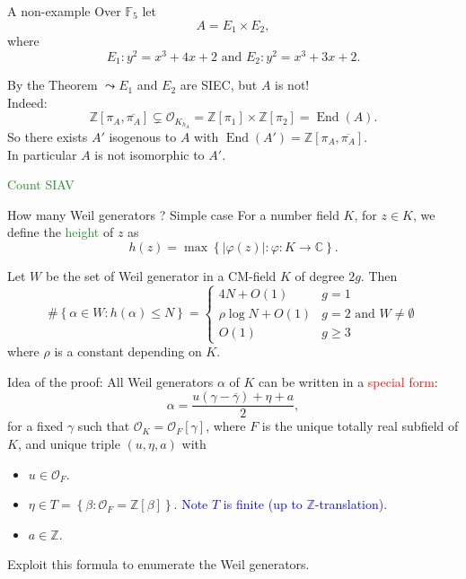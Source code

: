 \documentclass[usenames,dvipsnames,handout]{beamer}
\def\Z{\mathbb{Z}}
\def\C{\mathbb{C}}
\def\F{\mathbb{F}}
\DeclareMathOperator{\Pic}{Pic}
\DeclareMathOperator{\End}{End}
\newcommand{\cO}{{\mathcal O}}
\newcommand{\vphi}{\varphi}
\newcommand{\set}[1]{\left\lbrace#1\right\rbrace }
\newcommand{\red}[1]{\textcolor{red}{#1}}
\newcommand{\blue}[1]{\textcolor{blue}{#1}}
\newcommand{\green}[1]{\textcolor{ForestGreen}{#1}}
\begin{document}
\begin{frame}{ A non-example }
    Over $\F_5$ let
    \[ A = E_1 \times E_2, \]
    where
    \[ E_1: y^2 = x^3 + 4x + 2 \text{ and } E_2: y^2 = x^3 + 3x + 2. \]  
      
    \pause By the Theorem $\leadsto E_1$ and $E_2$ are SIEC, but $A$ is not!\\
    \pause Indeed:
    \[\Z[\pi_A,\overline{\pi_A}] \subsetneq \cO_{K_{h_A}}=\Z[\pi_1]\times \Z[\pi_2]=\End(A).\]
    So there exists $A'$ isogenous to $A$ with $\End(A')=\Z[\pi_A,\overline{\pi_A}]$.\\
    In particular $A$ is not isomorphic to $A'$.
\end{frame}

\begin{frame}{ }
    \begin{center}
    \green{\huge Count SIAV}
    \end{center}
\end{frame}

\begin{frame}{ How many Weil generators ? Simple case }
    For a number field $K$, for $z \in K$, we define the \green{height} of $z$ as 
    \[ h(z)= \max\set{|\vphi(z)| : \vphi: K\to \C }. \]
    \pause    
    \begin{theorem}[Scholl 2020]
    Let $W$ be the set of Weil generator in a CM-field $K$ of degree $2g$.
    \pause Then
    \[ 
    \#\set{ \alpha\in W : h(\alpha)\leq N }=
    \begin{cases}
        4N+O(1)             & g=1\\
        \rho \log N +O(1)   & g=2\text{ and }W\neq \emptyset\\
        O(1)                & g\geq 3
    \end{cases}    
     \]
    where $\rho$ is a constant depending on $K$.
    \end{theorem}
\end{frame}

\begin{frame}{  }
    Idea of the proof:
    All Weil generators $\alpha$ of $K$ can be written in a \red{special form}:
    \[\alpha = \frac{u(\gamma - \overline{\gamma}) + \eta + a}{2},\]
    \pause
    for a fixed $\gamma$ such that $\cO_K=\cO_F[\gamma]$, where $F$ is the unique totally real subfield of $K$,
    \pause and unique triple $(u,\eta,a)$ with
    \begin{itemize}
        \item $u \in \cO_{F}$.
        \item $\eta \in T=\set{ \beta : \cO_F=\Z[\beta] }$. \blue{Note $T$ is finite (up to $\Z$-translation).}
        \item $a\in\Z$.
    \end{itemize}
    \pause Exploit this formula to enumerate the Weil generators.
\end{frame}
\end{document}
